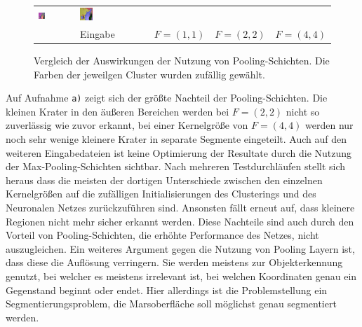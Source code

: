 \begin{figure}[h!]
\begin{tabular}{m{15pt}m{}m{}m{}m{}}
		\includegraphics[width=0.2\textwidth]{images/gen/pooling_layers/p03_04.png_2.png} &
		\includegraphics[width=0.2\textwidth]{images/gen/pooling_layers/p03_04.png_4.png} \\
		
		&
		\vspace*{2pt}\centering Eingabe & 
		\vspace*{2pt}\centering $F=(1, 1)$ &
		\vspace*{2pt}\centering $F=(2, 2)$ &
		\vspace*{2pt}\centering $F=(4, 4)$ 
	\end{tabular}
	\caption{Vergleich der Auswirkungen der Nutzung von Pooling-Schichten. Die Farben der jeweilgen Cluster wurden zufällig gewählt.}
	\label{fig:maxpool_comparision}
\end{figure}

Auf Aufnahme \texttt{a)} zeigt sich der größte Nachteil der Pooling-Schichten. Die kleinen Krater in den äußeren Bereichen werden bei $F=(2, 2)$ nicht so zuverlässig wie zuvor erkannt, bei einer Kernelgröße von $F=(4, 4)$ werden nur noch sehr wenige kleinere Krater in separate Segmente eingeteilt. Auch auf den weiteren Eingabedateien ist keine Optimierung der Resultate durch die Nutzung der Max-Pooling-Schichten sichtbar. Nach mehreren Testdurchläufen stellt sich heraus dass die meisten der dortigen Unterschiede zwischen den einzelnen Kernelgrößen auf die zufälligen Initialisierungen des Clusterings und des Neuronalen Netzes zurückzuführen sind. Ansonsten fällt erneut auf, dass kleinere Regionen nicht mehr sicher erkannt werden. Diese Nachteile sind auch durch den Vorteil von Pooling-Schichten, die erhöhte Performance des Netzes, nicht auszugleichen. Ein weiteres Argument gegen die Nutzung von Pooling Layern ist, dass diese die Auflösung verringern. Sie werden meistens zur Objekterkennung genutzt, bei welcher es meistens irrelevant ist, bei welchen Koordinaten genau ein Gegenstand beginnt oder endet. Hier allerdings ist die Problemstellung ein Segmentierungsproblem, die Marsoberfläche soll möglichst genau segmentiert werden.

